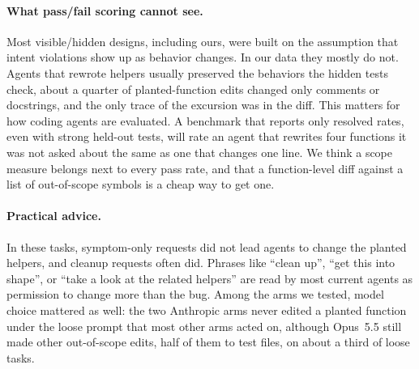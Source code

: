 \paragraph{What pass/fail scoring cannot see.}
Most visible/hidden designs, including ours, were built on the assumption
that intent violations show up as behavior changes. In our data they mostly
do not. Agents that rewrote helpers usually preserved the behaviors the
hidden tests check, about a quarter of planted-function edits changed only
comments or docstrings, and the only trace of the excursion was in the diff.
This matters for how coding agents are evaluated. A benchmark that reports
only resolved rates, even with strong held-out tests, will rate an agent that
rewrites four functions it was not asked about the same as one that changes
one line. We
think a scope measure belongs next to every pass rate, and that a
function-level diff against a list of out-of-scope symbols is a cheap way to
get one.

\paragraph{Practical advice.}
In these tasks, symptom-only requests did not lead agents to change the
planted helpers, and cleanup requests often did. Phrases like ``clean up'', ``get this into
shape'', or ``take a look at the related helpers'' are read by most current
agents as permission to change more than the bug. Among the arms we tested,
model choice mattered as well: the two Anthropic arms never edited a planted
function under the loose prompt that most other arms acted on, although
Opus~5.5 still made other out-of-scope edits, half of them to test files, on
about a third of loose tasks.
